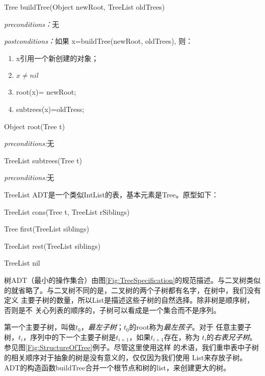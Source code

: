 \begin{figure*}[!t]
\colorbox[rgb]{0.9, 0.9, 0.9}{Tree buildTree(Object newRoot, TreeList oldTrees)}

\emph{preconditions：}无

\emph{postconditions：}如果 x=buildTree(newRoot, oldTrees), 则：
\begin{enumerate}
\item x引用一个新创建的对象；
\item $x\neq nil$
\item root(x)= newRoot;
\item subtrees(x)=oldTress;
\end{enumerate}

\colorbox[rgb]{0.9, 0.9, 0.9}{Object root(Tree t)}

\emph{preconditions:}无

\colorbox[rgb]{0.9, 0.9, 0.9}{TreeList subtrees(Tree t)}

\emph{preconditions:}无

TreeList ADT是一个类似IntList的表，基本元素是Tree。原型如下：

    TreeList cons(Tree t, TreeList rSiblings)

    Tree first(TreeList siblings)

    TreeList rest(TreeList siblings)

    TreeList nil

    \caption{树ADT的规范。类中比\textbf{Object}一般的节点的规范以类似的方法定义。}
    \label{Fig:TreeSpecification}
\end{figure*}

树ADT（最小的操作集合）由图\ref{Fig:TreeSpecification}的规范描述。与二叉树类似
的就省略了。与二叉树不同的是，二叉树的两个子树都有名字，在树中，我们没有定义
主要子树的数量，所以List是描述这些子树的自然选择。除非树是顺序树，否则是不
关心列表的顺序的，子树可以看成是一个集合而不是序列。

第一个主要子树，叫做$t_0$，\emph{最左子树}；$t_0$的root称为\emph{最左孩子}。对于
任意主要子树，$t_i$，序列中的下一个主要子树是$t_{i+1}$，如果$t_{i+1}$存在，称为
$t_i$的\emph{右表兄子树}。参见图\ref{Fig:StructureOfTree}例子。尽管这里使用这样
的术语，我们重申表中子树的相关顺序对于抽象的树是没有意义的，仅仅因为我们使用
List来存放子树。ADT的构造函数buildTree合并一个根节点和树的list，来创建更大的树。

